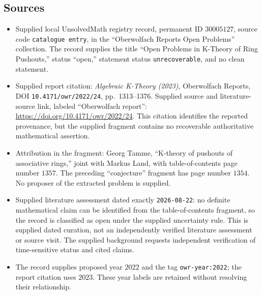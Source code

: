 \documentclass[11pt]{article}
\begin{document}
\subsection{Sources}
\begin{itemize}
\item Supplied local UnsolvedMath registry record, permanent ID \(30005127\), source code \texttt{catalogue entry}, in the ``Oberwolfach Reports Open Problems'' collection. The record supplies the title ``Open Problems in K-Theory of Ring Pushouts,'' status ``open,'' statement status \texttt{unrecoverable}, and no clean statement.
\item Supplied report citation: \emph{Algebraic K-Theory (2023)}, Oberwolfach Reports, DOI \texttt{10.4171/owr/2022/24}, pp.\ 1313--1376. Supplied source and literature-source link, labeled ``Oberwolfach report'': \url{https://doi.org/10.4171/owr/2022/24}. This citation identifies the reported provenance, but the supplied fragment contains no recoverable authoritative mathematical assertion.
\item Attribution in the fragment: Georg Tamme, ``K-theory of pushouts of associative rings,'' joint with Markus Land, with table-of-contents page number \(1357\). The preceding ``conjecture'' fragment has page number \(1354\). No proposer of the extracted problem is supplied.
\item Supplied literature assessment dated exactly \texttt{2026-08-22}: no definite mathematical claim can be identified from the table-of-contents fragment, so the record is classified as open under the supplied uncertainty rule. This is supplied dated curation, not an independently verified literature assessment or source visit. The supplied background requests independent verification of time-sensitive status and cited claims.
\item The record supplies proposed year \(2022\) and the tag \texttt{owr-year:2022}; the report citation uses \(2023\). These year labels are retained without resolving their relationship.
\end{itemize}
\end{document}
